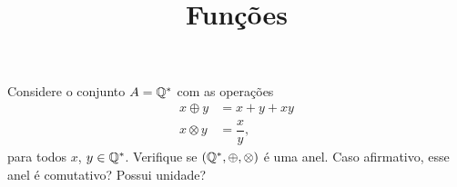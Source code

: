 \documentclass{beamer}
\title{Funções}
\author[\autor]{\autor}
\institute[\instituto]{\instituto}
\date{}
\begin{document}
    \begin{frame}
        \maketitle
    \end{frame}


    \begin{frame}
        \begin{exercicio}
            Considere o conjunto $A = \mathbb{Q}^*$ com as operações
            \begin{align*}
                x \oplus y &= x + y + xy\\
                x \otimes y &= \dfrac{x}{y},
            \end{align*}
            para todos $x$, $y \in \mathbb{Q}^*$. Verifique se $(\mathbb{Q}^*, \oplus, \otimes)$ é uma anel. Caso afirmativo, esse anel é comutativo? Possui unidade?
        \end{exercicio}

    \end{frame}
\end{document}
